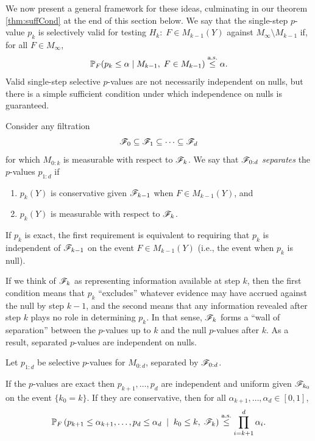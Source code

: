 \documentclass{article}
\begin{document}
\medskip

We now present a general framework for these ideas, culminating in our theorem \ref{thm:suffCond} at the end of this section below.
We say that the  single-step $p$-value $p_k$ is selectively valid for testing $H_k:\; F \in M_{k-1}(Y)$ against $M_\infty \setminus M_{k-1}$ if, for all $F\in M_\infty$,
\[
\mathbb{P}_F(p_k \leq \alpha \mid M_{k-1},\; F\in M_{k-1}) \overset{\textrm{a.s.}}{\leq} \alpha.
\]
Valid single-step selective $p$-values are not necessarily independent on nulls, but there is a simple sufficient condition under which independence on nulls is guaranteed.

Consider any filtration
\[
\mathscr{F}_0 \subseteq \mathscr{F}_1 \subseteq \cdots \subseteq \mathscr{F}_d
\]
for which $M_{0:k}$ is measurable with respect to $\mathscr{F}_k$. We say that $\mathscr{F}_{0:d}$ {\em separates} the $p$-values $p_{1:d}$ if 
\begin{enumerate}
\item $p_k(Y)$ is conservative given $\mathscr{F}_{k-1}$ 
  when $F\in M_{k-1}(Y)$, and
\item $p_k(Y)$ is measurable with respect to $\mathscr{F}_k$.
\end{enumerate}
If $p_k$ is exact, the first requirement is equivalent to requiring that $p_k$ is independent of $\mathscr{F}_{k-1}$ on the event $F\in M_{k-1}(Y)$ (i.e., the event when $p_k$ is null).

If we think of $\mathscr{F}_k$ as representing information available at step $k$, then the first condition means that $p_k$ ``excludes'' whatever evidence may have accrued against the null by step $k-1$, and the second means that any information revealed after step $k$ plays no role in determining $p_k$. In that sense, $\mathscr{F}_k$ forms a ``wall of separation'' between the $p$-values up to $k$ and the null $p$-values after $k$. As a result, separated $p$-values are independent on nulls.

\begin{proposition}\label{prop:jointConserv}

  Let $p_{1:d}$ be selective $p$-values for $M_{0:d}$, 
  separated by $\mathscr{F}_{0:d}$.

  If the $p$-values are exact then $p_{k+1}, \ldots, p_d$ are
  independent and uniform given $\mathscr{F}_{k_0}$ on the event $\{k_0=k\}$.
  If they are conservative, then for all
  $\alpha_{k+1},\ldots,\alpha_d \in [0,1]$,
  \begin{equation}\label{eq:jointConserv}
  \mathbb{P}_F\left(p_{k+1}\leq \alpha_{k+1}, \ldots, p_d \leq \alpha_d\;
    \mid\; k_0 \leq k, \; \mathscr{F}_k\right) \overset{\textrm{a.s.}}{\leq} \prod_{i=k+1}^d
  \alpha_i.
  \end{equation}
\end{proposition}
\end{document}
